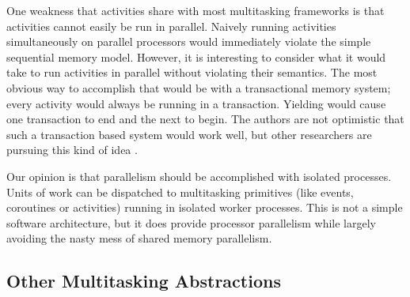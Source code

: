 \documentclass[preprint, 10pt, numbers]{sigplanconf}
\begin{document}
One weakness that activities share with most multitasking frameworks is that activities cannot easily be run in parallel.
Naively running activities simultaneously on parallel processors would immediately violate the simple sequential memory model.
However, it is interesting to consider what it would take to run activities in parallel without violating their semantics.
The most obvious way to accomplish that would be with a transactional memory system; every activity would always be running in a transaction.
Yielding would cause one transaction to end and the next to begin.
The authors are not optimistic that such a transaction based system would work well, but other researchers are pursuing this kind of idea \cite{ONeill2015, Boussinot2006, Dabrowski2006}.

Our opinion is that parallelism should be accomplished with isolated processes.
Units of work can be dispatched to multitasking primitives (like events, coroutines or activities) running in isolated worker processes.
This is not a simple software architecture, but it does provide processor parallelism while largely avoiding the nasty mess of shared memory parallelism.






\subsection{Other Multitasking Abstractions}
\end{document}
